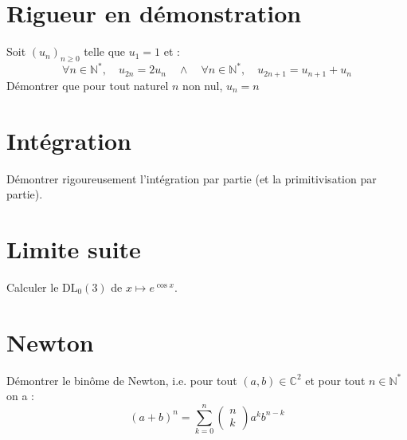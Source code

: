 \documentclass[a4paper, titlepage]{article}
\begin{document}
	\section{Rigueur en démonstration}
	Soit $(u_n)_{n\geqslant 0}$ telle que $u_1 = 1$ et :
	$$ \forall n\in\mathbb{N}^*,\quad u_{2n} = 2u_n\quad\land\quad \forall n\in\mathbb{N}^*,\quad u_{2n+1}=u_{n+1}+u_n $$
	Démontrer que pour tout naturel $n$ non nul, $u_n = n$
	\section{Intégration}
	Démontrer rigoureusement l'intégration par partie (et la primitivisation par partie).
	\section{Limite suite}
	Calculer le $\mathrm{DL}_0(3)$ de $x\longmapsto e^{\cos x}$.
	\section{Newton}
	Démontrer le binôme de Newton, i.e. pour tout $(a,b)\in\mathbb{C}^2$ et pour tout $n\in\mathbb{N}^*$ on a :
	$$ (a+b)^n = \sum_{k=0}^{n} \begin{pmatrix} n\\k \end{pmatrix} a^{k}b^{n-k} $$
\end{document}
